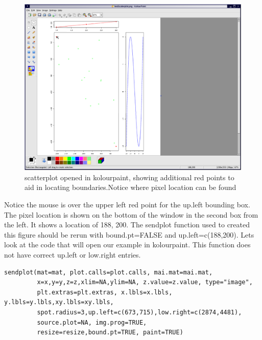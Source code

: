 \documentclass[]{article}
\begin{document}
\begin{center}
\begin{figure}
\includegraphics{sendPlot2}
\caption{scatterplot opened in kolourpaint, showing additional red points to aid in locating boundaries.Notice where pixel location can be found}
\end{figure}
\end{center}

\quad Notice the mouse is over the upper left red point for the up.left bounding box. The pixel location is shown on the bottom of the window in the second box from the left. It shows a location of 188, 200. The sendplot function used to created this figure should be rerun with bound.pt=FALSE and up.left=c(188,200). Lets look at the code that will open our example in kolourpaint. This function does not have correct up.left or low.right entries. 

\begin{verbatim}
sendplot(mat=mat, plot.calls=plot.calls, mai.mat=mai.mat,
         x=x,y=y,z=z,xlim=NA,ylim=NA, z.value=z.value, type="image",
         plt.extras=plt.extras, x.lbls=x.lbls, y.lbls=y.lbls,xy.lbls=xy.lbls, 
         spot.radius=3,up.left=c(673,715),low.right=c(2874,4481),
         source.plot=NA, img.prog=TRUE,
         resize=resize,bound.pt=TRUE, paint=TRUE)
\end{verbatim}
\end{document}
